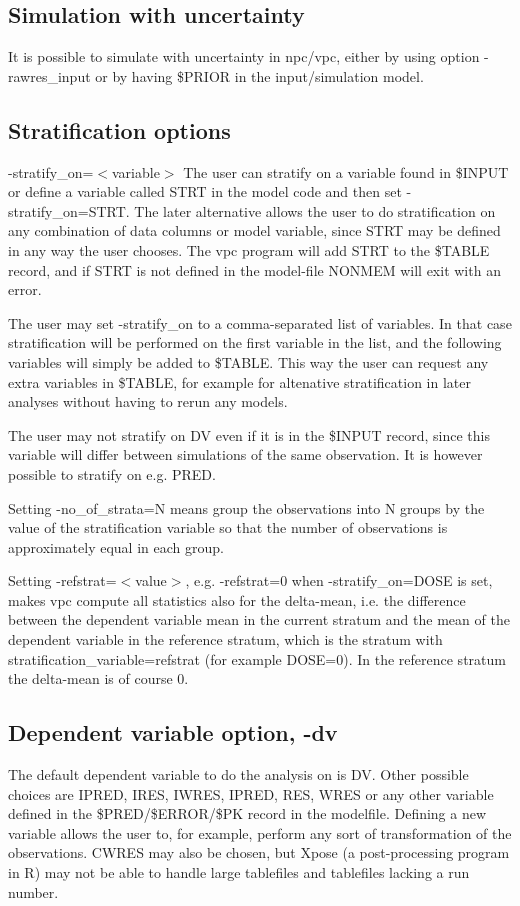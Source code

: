 \subsection{Simulation with uncertainty}
It is possible to simulate with uncertainty in npc/vpc, either by using option -rawres\_input or by having \$PRIOR in the input/simulation model.

\subsection{Stratification options}
-stratify\_on=$<$variable$>$ The user can stratify on a variable found in \$INPUT or define a variable called STRT in the model code and then set -stratify\_on=STRT. The later alternative allows the user to do stratification on any combination of data columns or model variable, since STRT may be defined in any way the user chooses. The vpc program will add STRT to the \$TABLE record, and if STRT is not defined in the model-file NONMEM will exit with an error. 

The user may set -stratify\_on to a comma-separated list of variables. In that case stratification will be performed on the first variable in the list, and the following variables will simply be added to \$TABLE. This way the user can request any extra variables in \$TABLE, for example for altenative stratification in later analyses without having to rerun any models.

The user may not stratify on DV even if it is in the \$INPUT record, since this variable will differ between simulations of the same observation. It is however possible to stratify on e.g. PRED.

Setting -no\_of\_strata=N means group the observations into N groups by the value of the stratification variable so that the number of observations is approximately equal in each group.

Setting -refstrat=$<$value$>$, e.g. -refstrat=0 when -stratify\_on=DOSE is set, makes vpc compute all statistics also for the delta-mean, i.e. the difference between the dependent variable mean in the current stratum and the mean of the dependent variable in the reference stratum, which is the stratum with stratification\_variable=refstrat (for example DOSE=0). In the reference stratum the delta-mean is of course 0.

\subsection{Dependent variable option, -dv}
The default dependent variable to do the analysis on is DV. Other possible choices are IPRED, IRES, IWRES, IPRED, RES, WRES or any other variable defined in the \$PRED/\$ERROR/\$PK record in the modelfile. Defining a new variable allows the user to, for example, perform any sort of transformation of the observations. CWRES may also be chosen, but Xpose (a post-processing program in R) may not be able to handle large tablefiles and tablefiles lacking a run number. 

